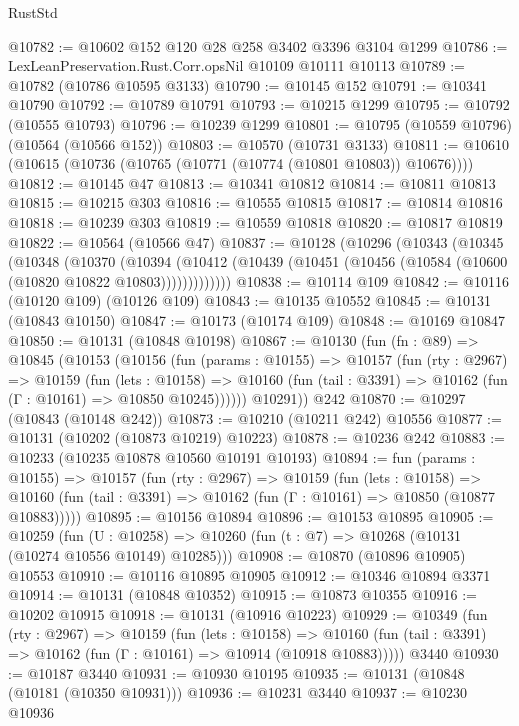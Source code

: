 \begin{lexlean}{RustStd}
\begin{coremodule}
@10782 := @10602 @152 @120 @28 @258 @3402 @3396 @3104 @1299
@10786 := LexLeanPreservation.Rust.Corr.opsNil @10109 @10111 @10113
@10789 := @10782 (@10786 @10595 @3133)
@10790 := @10145 @152
@10791 := @10341 @10790
@10792 := @10789 @10791
@10793 := @10215 @1299
@10795 := @10792 (@10555 @10793)
@10796 := @10239 @1299
@10801 := @10795 (@10559 @10796) (@10564 (@10566 @152))
@10803 := @10570 (@10731 @3133)
@10811 := @10610 (@10615 (@10736 (@10765 (@10771 (@10774 (@10801 @10803)) @10676))))
@10812 := @10145 @47
@10813 := @10341 @10812
@10814 := @10811 @10813
@10815 := @10215 @303
@10816 := @10555 @10815
@10817 := @10814 @10816
@10818 := @10239 @303
@10819 := @10559 @10818
@10820 := @10817 @10819
@10822 := @10564 (@10566 @47)
@10837 := @10128
    (@10296
      (@10343
        (@10345
          (@10348
            (@10370
              (@10394
                (@10412 (@10439 (@10451 (@10456 (@10584 (@10600 (@10820 @10822 @10803)))))))))))))
@10838 := @10114 @109
@10842 := @10116 (@10120 @109) (@10126 @109)
@10843 := @10135 @10552
@10845 := @10131 (@10843 @10150)
@10847 := @10173 (@10174 @109)
@10848 := @10169 @10847
@10850 := @10131 (@10848 @10198)
@10867 := @10130
    (fun (fn : @89) =>
    @10845
      (@10153
        (@10156
          (fun (params : @10155) =>
          @10157
            (fun (rty : @2967) =>
            @10159
              (fun (lets : @10158) =>
              @10160 (fun (tail : @3391) => @10162 (fun (Γ : @10161) => @10850 @10245))))))
        @10291))
    @242
@10870 := @10297 (@10843 (@10148 @242))
@10873 := @10210 (@10211 @242) @10556
@10877 := @10131 (@10202 (@10873 @10219) @10223)
@10878 := @10236 @242
@10883 := @10233 (@10235 @10878 @10560 @10191 @10193)
@10894 := fun (params : @10155) =>
  @10157
    (fun (rty : @2967) =>
    @10159
      (fun (lets : @10158) =>
      @10160 (fun (tail : @3391) => @10162 (fun (Γ : @10161) => @10850 (@10877 @10883)))))
@10895 := @10156 @10894
@10896 := @10153 @10895
@10905 := @10259
    (fun (U : @10258) => @10260 (fun (t : @7) => @10268 (@10131 (@10274 @10556 @10149) @10285)))
@10908 := @10870 (@10896 @10905) @10553
@10910 := @10116 @10895 @10905
@10912 := @10346 @10894 @3371
@10914 := @10131 (@10848 @10352)
@10915 := @10873 @10355
@10916 := @10202 @10915
@10918 := @10131 (@10916 @10223)
@10929 := @10349
    (fun (rty : @2967) =>
    @10159
      (fun (lets : @10158) =>
      @10160 (fun (tail : @3391) => @10162 (fun (Γ : @10161) => @10914 (@10918 @10883)))))
    @3440
@10930 := @10187 @3440
@10931 := @10930 @10195
@10935 := @10131 (@10848 (@10181 (@10350 @10931)))
@10936 := @10231 @3440
@10937 := @10230 @10936

\end{coremodule}
\end{lexlean}
